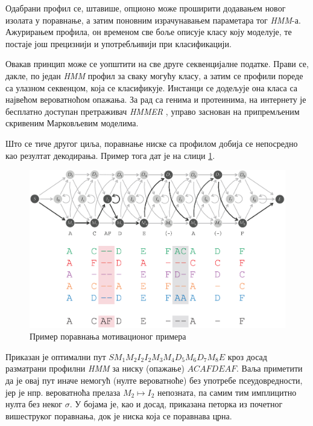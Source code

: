 \documentclass[12pt,oneside]{memoir}
\begin{document}
\begin{CJK}{UTF8}{ipxm}
Одабрани профил се, штавише, опционо може проширити додавањем новог изолата у поравнање, а затим поновним израчунавањем параметара тог \textit{HMM}-а. Ажурирањем профила, он временом све боље описује класу коју моделује, те постаје још прецизнији и употребљивији при класификацији.

Овакав принцип може се уопштити на све друге секвенцијалне податке. Прави се, дакле, по један \textit{HMM} профил за сваку могућу класу, а затим се профили пореде са улазном секвенцом, која се класификује. Инстанци се додељује она класа са највећом вероватноћом опажања. За рад са генима и протеинима, на интернету је бесплатно доступан претраживач \textit{HMMER} \cite{hmmer}, управо заснован на припремљеним скривеним Марковљевим моделима.

Што се тиче другог циља, поравнање ниске са профилом добија се непосредно као резултат декодирања. Пример тога дат је на слици \ref{fig:poravnanje}.

\begin{figure}[H]
  \centering
  \includegraphics[width=\textwidth]{poravnanje.png}
  \caption{Пример поравнања мотивационог примера \cite{compeau2015}}
  \label{fig:poravnanje}
\end{figure}

Приказан је оптимални пут $S M_1 M_2 I_2 I_2 M_3 M_4 D_5 M_6 D_7 M_8 E$ кроз досад разматрани профилни \textit{HMM} за ниску (опажање) $ACAFDEAF$. Ваља приметити да је овај пут иначе немогућ (нулте вероватноће) без употребе псеудовредности, јер је нпр. вероватноћа прелаза $M_2 \mapsto I_2$ непозната, па самим тим имплицитно нулта без неког $\sigma$. У бојама је, као и досад, приказана петорка из почетног вишеструког поравнања, док је ниска која се поравнава црна.


\end{CJK}
\end{document}
